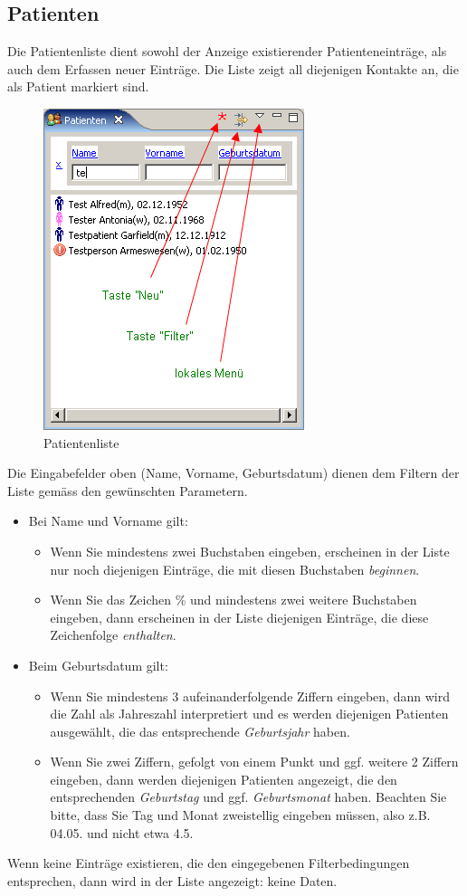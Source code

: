 \subsection{Patienten}
Die Patientenliste dient sowohl der Anzeige existierender Patienteneinträge, als
auch dem Erfassen neuer Einträge. Die Liste zeigt all diejenigen Kontakte an,
die als Patient markiert sind.
\begin{figure}[ht]
	\includegraphics{images/patlistview}
	\caption{Patientenliste}
	\label{fig:patlist}
\end{figure}
Die Eingabefelder oben (Name, Vorname, Geburtsdatum) dienen dem Filtern der
Liste gemäss den gewünschten Parametern.
\begin{itemize}
  \item Bei Name und Vorname gilt:
	\begin{itemize}
      \item Wenn Sie mindestens zwei Buchstaben eingeben, erscheinen in der
      Liste nur noch diejenigen Einträge, die mit diesen Buchstaben \textit{beginnen}.
      \item Wenn Sie das Zeichen \% und mindestens zwei weitere Buchstaben
      eingeben, dann erscheinen in der Liste diejenigen Einträge, die diese
      Zeichenfolge \textit{enthalten}.
    \end{itemize}
  \item Beim Geburtsdatum gilt:
	\begin{itemize}
      \item Wenn Sie mindestens 3 aufeinanderfolgende Ziffern eingeben, dann wird
      die Zahl als Jahreszahl interpretiert und es werden diejenigen Patienten
      ausgewählt, die das entsprechende \textit{Geburtsjahr} haben.
      \item Wenn Sie zwei Ziffern, gefolgt von einem Punkt und ggf. weitere 2
      Ziffern eingeben, dann werden diejenigen Patienten angezeigt, die den
      entsprechenden \textit{Geburtstag} und ggf. \textit{Geburtsmonat} haben.
      Beachten Sie bitte, dass Sie Tag und Monat zweistellig eingeben müssen,
      also z.B. 04.05. und nicht etwa 4.5.
     \end{itemize}
\end{itemize}
Wenn keine Einträge existieren, die den eingegebenen Filterbedingungen
entsprechen, dann wird in der Liste angezeigt: \glqq keine Daten\grqq.
